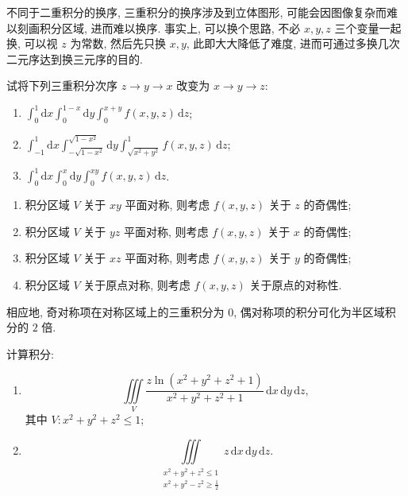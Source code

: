 \documentclass[../数学分析培优讲义.tex]{subfiles}
\begin{document}
不同于二重积分的换序, 三重积分的换序涉及到立体图形, 可能会因图像复杂而难以刻画积分区域, 进而难以换序. 事实上, 可以换个思路, 不必 $x,y,z$ 三个变量一起换, 可以视 $z$ 为常数, 然后先只换 $x,y$, 此即大大降低了难度, 进而可通过多换几次二元序达到换三元序的目的.

\begin{example}[\markstar]
试将下列三重积分次序 $z\to y\to x$ 改变为 $x\to y\to z$:
\begin{enumerate}[label=(\arabic*)]
    \item $\displaystyle\int_0^1\mathrm{d}x\int_0^{1-x}\mathrm{d}y\int_0^{x+y}f(x,y,z)\,\mathrm{d}z$;
    \item $\displaystyle\int_{-1}^1\mathrm{d}x\int_{-\sqrt{1-x^2}}^{\sqrt{1-x^2}}\mathrm{d}y\int_{\sqrt{x^2+y^2}}^1f(x,y,z)\,\mathrm{d}z$;
    \item $\displaystyle\int_0^1\mathrm{d}x\int_0^x\mathrm{d}y\int_0^{xy}f(x,y,z)\,\mathrm{d}z$.
\end{enumerate}
\end{example}
\exampleblank

\begin{theorem}
\begin{enumerate}[label=(\arabic*)]
    \item 积分区域 $V$ 关于 $xy$ 平面对称, 则考虑 $f(x,y,z)$ 关于 $z$ 的奇偶性;
    \item 积分区域 $V$ 关于 $yz$ 平面对称, 则考虑 $f(x,y,z)$ 关于 $x$ 的奇偶性;
    \item 积分区域 $V$ 关于 $xz$ 平面对称, 则考虑 $f(x,y,z)$ 关于 $y$ 的奇偶性;
    \item 积分区域 $V$ 关于原点对称, 则考虑 $f(x,y,z)$ 关于原点的对称性.
\end{enumerate}
相应地, 奇对称项在对称区域上的三重积分为 $0$, 偶对称项的积分可化为半区域积分的 $2$ 倍.
\end{theorem}

\begin{example}
计算积分:
\begin{enumerate}[label=(\arabic*)]
    \item
    \[
        \iiint\limits_V\dfrac{z\ln(x^2+y^2+z^2+1)}{x^2+y^2+z^2+1}\,\mathrm{d}x\,\mathrm{d}y\,\mathrm{d}z,
    \]
    其中 $V:x^2+y^2+z^2\leq1$;
    \item
    \[
        \iiint\limits_{\substack{x^2+y^2+z^2\leq1\\x^2+y^2-z^2\geq\frac{1}{2}}}z\,\mathrm{d}x\,\mathrm{d}y\,\mathrm{d}z.
    \]
\end{enumerate}
\end{example}
\exampleblank
\end{document}
